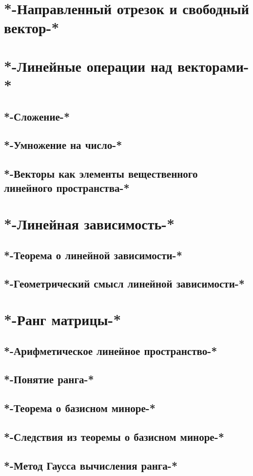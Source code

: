\chapter{*-Направленный отрезок и свободный вектор-*}
\chapter{*-Линейные операции над векторами-*}
\section{*-Сложение-*}
\section{*-Умножение на число-*}
\section{*-Векторы как элементы вещественного линейного пространства-*}
\chapter{*-Линейная зависимость-*}
\section{*-Теорема о линейной зависимости-*}
\section{*-Геометрический смысл линейной зависимости-*}
\chapter{*-Ранг матрицы-*}
\section{*-Арифметическое линейное пространство-*}
\section{*-Понятие ранга-*}
\section{*-Теорема о базисном миноре-*}
\section{*-Следствия из теоремы о базисном миноре-*}
\section{*-Метод Гаусса вычисления ранга-*}
